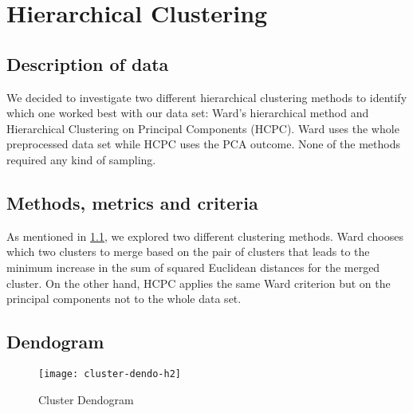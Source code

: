 

\section{Hierarchical Clustering}%
\label{sec:hierarchical_clustering}

\subsection{Description of data}%
\label{sub:description_data}


We decided to investigate two different hierarchical clustering methods to
identify which one worked best with our data set: Ward's hierarchical method and 
Hierarchical Clustering on Principal Components (HCPC). Ward uses
the whole preprocessed data set while HCPC uses the PCA outcome. None of the
methods required any kind of sampling.

\subsection{Methods, metrics and criteria}


As mentioned in \ref{sub:description_data}, we explored two different clustering methods.
Ward chooses which two clusters to merge based on the pair of clusters that leads to the
minimum increase in the sum of squared Euclidean distances for the merged cluster. 
On the other hand, HCPC applies the same Ward criterion but on the principal components 
not to the whole data set.


\subsection{Dendogram}

\begin{figure}[H]
    \centering
    \texttt{[image: cluster-dendo-h2]}
    \caption{Cluster Dendogram}%
    \label{fig:dendogram-h2}
\end{figure}


